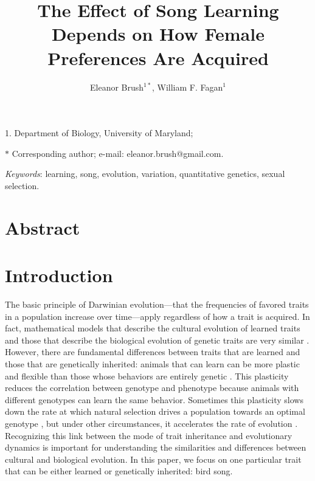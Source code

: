 \documentclass[12pt]{article}
\title{The Effect of Song Learning Depends on How Female Preferences Are Acquired}
\author{Eleanor Brush$^{1\ast}$, William F. Fagan$^{1}$}
\date{}
\begin{document}
\maketitle

\noindent{} 1. Department of Biology, University of Maryland;

\noindent{} $\ast$ Corresponding author; e-mail: eleanor.brush@gmail.com.


\bigskip

\textit{Keywords}: learning, song, evolution, variation, quantitative genetics, sexual selection.

\bigskip

\bigskip

\thispagestyle{fancy}
\newpage{}

\section*{Abstract}

\section*{Introduction}

The basic principle of Darwinian evolution---that the frequencies of favored traits in a population increase over time---apply regardless of how a trait is acquired. In fact, mathematical models that describe the cultural evolution of learned traits and those that describe the biological evolution of genetic traits are very similar \cite{Mesoudi:2006fk}. However, there are fundamental differences between traits that are learned and those that are genetically inherited: animals that can learn can be more plastic and flexible than those whose behaviors are entirely genetic \cite{Ancel:2000vn,Anderson:1995ys}. This plasticity reduces the correlation between genotype and phenotype because animals with different genotypes can learn the same behavior. Sometimes this plasticity slows down the rate at which natural selection drives a population towards an optimal genotype \cite{Lachlan:2004tg,Ancel:2000vn,Anderson:1995ys}, but under other circumstances, it accelerates the rate of evolution \cite{Ancel:2000vn}. Recognizing this link between the mode of trait inheritance and evolutionary dynamics is important for understanding the similarities and differences between cultural and biological evolution. In this paper, we focus on one particular trait that can be either learned or genetically inherited: bird song.  
\end{document}
